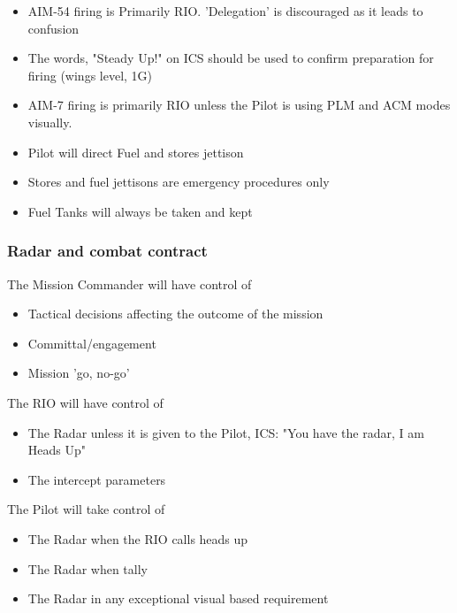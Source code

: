 \begin{itemize}

  \item AIM-54 firing is Primarily RIO. 'Delegation' is discouraged as it leads
    to confusion

  \item The words, "Steady Up!" on ICS should be used to confirm preparation
    for firing (wings level, 1G)

  \item AIM-7 firing is primarily RIO unless the Pilot is using PLM and ACM
    modes visually.

  \item Pilot will direct Fuel and stores jettison

  \item Stores and fuel jettisons are emergency procedures only

  \item Fuel Tanks will always be taken and kept

\end{itemize}

\subsubsection{Radar and combat contract}

The Mission Commander will have control of

\begin{itemize}
  \item Tactical decisions affecting the outcome of the mission
  \item Committal/engagement
  \item Mission 'go, no-go'
\end{itemize}

The RIO will have control of

\begin{itemize}

  \item The Radar unless it is given to the Pilot, ICS: "You have the radar, I
    am Heads Up"

  \item The intercept parameters

\end{itemize}

The Pilot will take control of

\begin{itemize}
  \item The Radar when the RIO calls heads up
  \item The Radar when tally
  \item The Radar in any exceptional visual based requirement
\end{itemize}

